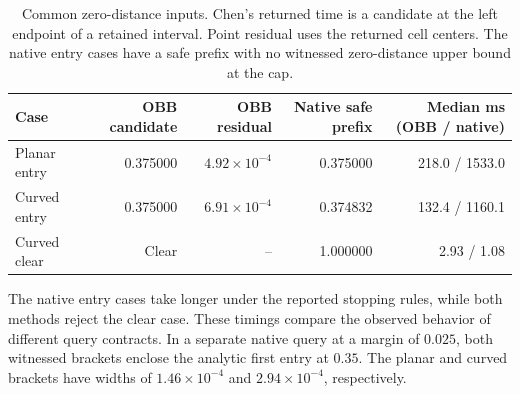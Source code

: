 \begin{table}[!htbp]
\centering\small
\caption{Common zero-distance inputs. Chen's returned time is a candidate
at the left endpoint of a retained interval. Point residual uses the
returned cell centers. The native entry cases have a safe prefix with
no witnessed zero-distance upper bound at the cap.}
\label{tab:chen-common}
\begin{tabular}{lrrrr}
\toprule
Case & OBB candidate & OBB residual & Native safe prefix & Median ms (OBB / native)\\
\midrule
Planar entry & 0.375000 & \(4.92\times10^{-4}\) & 0.375000 & 218.0 / 1533.0\\
Curved entry & 0.375000 & \(6.91\times10^{-4}\) & 0.374832 & 132.4 / 1160.1\\
Curved clear & Clear & -- & 1.000000 & 2.93 / 1.08\\
\bottomrule
\end{tabular}
\end{table}

The native entry cases take longer under the reported stopping rules,
while both methods reject the clear case. These timings compare the
observed behavior of different query contracts. In a separate native query
at a margin of \(0.025\), both witnessed brackets enclose the analytic
first entry at \(0.35\). The planar and curved brackets have widths of
\(1.46\times10^{-4}\) and \(2.94\times10^{-4}\), respectively.

\ifdefined\RotationFollowupRows

\fi
